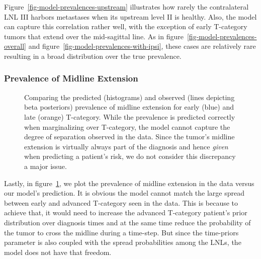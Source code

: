 \documentclass[
  sn-mathphys-num,
]{sn-jnl}
\begin{document}
Figure~\ref{fig-model-prevalences-upstream} illustrates how rarely the
contralateral LNL III harbors metastases when its upstream level II is
healthy. Also, the model can capture this correlation rather well, with
the exception of early T-category tumors that extend over the
mid-sagittal line. As in figure~\ref{fig-model-prevalences-overall} and
figure~\ref{fig-model-prevalences-with-ipsi}, these cases are relatively
rare resulting in a broad distribution over the true prevalence.

\subsubsection{Prevalence of Midline
Extension}\label{prevalence-of-midline-extension}

\begin{figure}


\caption{\label{fig-model-prevalences-midext}Comparing the predicted
(histograms) and observed (lines depicting beta posteriors) prevalence
of midline extension for early (blue) and late (orange) T-category.
While the prevalence is predicted correctly when marginalizing over
T-category, the model cannot capture the degree of separation observed
in the data. Since the tumor's midline extension is virtually always
part of the diagnosis and hence \emph{given} when predicting a patient's
risk, we do not consider this discrepancy a major issue.}

\end{figure}%

Lastly, in figure~\ref{fig-model-prevalences-midext}, we plot the
prevalence of midline extension in the data versus our model's
prediction. It is obvious the model cannot match the large spread
between early and advanced T-category seen in the data. This is because
to achieve that, it would need to increase the advanced T-category
patient's prior distribution over diagnosis times and at the same time
reduce the probability of the tumor to cross the midline during a
time-step. But since the time-priors parameter is also coupled with the
spread probabilities among the LNLs, the model does not have that
freedom.
\end{document}
